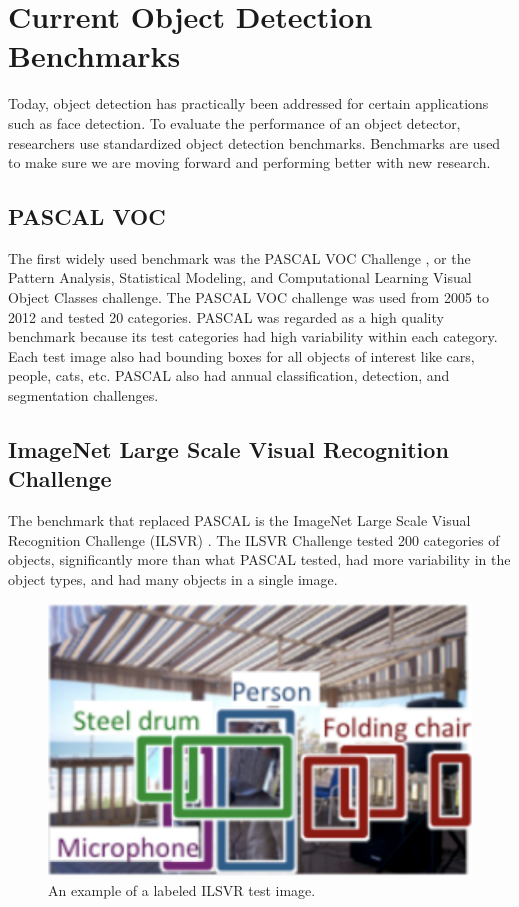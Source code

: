 \documentclass{article}
\begin{document}
\section{Current Object Detection Benchmarks}
Today, object detection has practically been addressed for certain applications such as face detection. To evaluate the performance of an object detector, researchers use standardized object detection benchmarks. Benchmarks are used to make sure we are moving forward and performing better with new research.

\subsection{PASCAL VOC} 
The first widely used benchmark was the PASCAL VOC Challenge \cite{pascal-voc-2012}, or the Pattern Analysis, Statistical Modeling, and Computational Learning Visual Object Classes challenge. The PASCAL VOC challenge was used from 2005 to 2012 and tested 20 categories. PASCAL was regarded as a high quality benchmark because its test categories had high variability within each category. Each test image also had bounding boxes for all objects of interest like cars, people, cats, etc. PASCAL also had annual classification, detection, and segmentation challenges.

\subsection{ImageNet Large Scale Visual Recognition Challenge}
The benchmark that replaced PASCAL is the ImageNet Large Scale Visual Recognition Challenge (ILSVR) \cite{ILSVRC15}. The ILSVR Challenge tested 200 categories of objects, significantly more than what PASCAL tested, had more variability in the object types, and had many objects in a single image.

\begin{figure}[h]
	\includegraphics[width=\textwidth]{ilsvr.png}
    \caption{An example of a labeled ILSVR test image.}
\end{figure}
\end{document}
